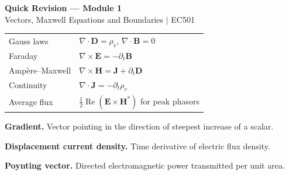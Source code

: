 \documentclass[12pt,a4paper]{article}
\renewcommand{\arraystretch}{1.45}
\begin{document}
\newpage
\begin{center}
  {\large\bfseries\color{myred} Quick Revision --- Module 1}\\[3pt]
  {\small\color{mydark} Vectors, Maxwell Equations and Boundaries $|$ EC501}
\end{center}
\noindent{\color{myred}\rule{\linewidth}{1.2pt}}
\begin{tcolorbox}[formulabox,title={Key Formulas at a Glance}]
\renewcommand{\arraystretch}{1.35}
\begin{tabularx}{\linewidth}{B{5.0cm}Y}
Gauss laws & $\nabla\cdot\mathbf D=\rho_v$, $\nabla\cdot\mathbf B=0$ \\[3pt]
Faraday & $\nabla\times\mathbf E=-\partial_t\mathbf B$ \\[3pt]
Amp\`ere--Maxwell & $\nabla\times\mathbf H=\mathbf J+\partial_t\mathbf D$ \\[3pt]
Continuity & $\nabla\cdot\mathbf J=-\partial_t\rho_v$ \\[3pt]
Average flux & $\tfrac12\operatorname{Re}(\mathbf E\times\mathbf H^*)$ for peak phasors \\[3pt]
\end{tabularx}
\end{tcolorbox}
\begin{tcolorbox}[defbox,title={One-Line Definitions}]
\textbf{Gradient.} Vector pointing in the direction of steepest increase of a scalar.\par
\textbf{Displacement current density.} Time derivative of electric flux density.\par
\textbf{Poynting vector.} Directed electromagnetic power transmitted per unit area.\par
\end{tcolorbox}
\end{document}
